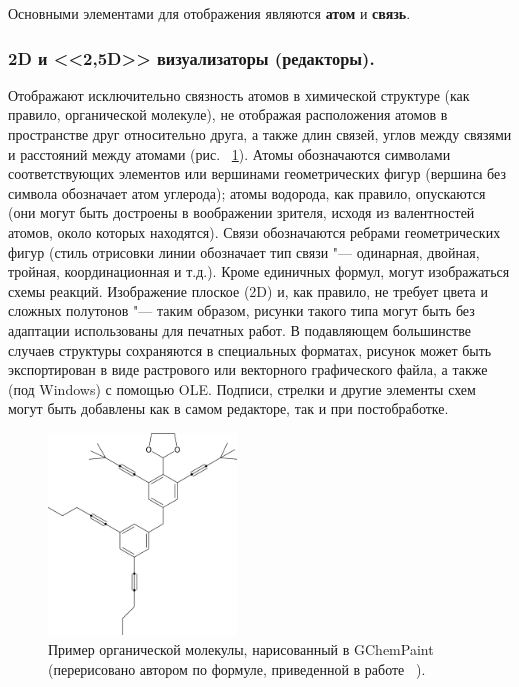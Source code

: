 \documentclass[10pt, a5paper]{article}
\begin{document}
Основными элементами для отображения являются \textbf{атом} и \linebreak\textbf{связь}.

\subsubsection*{2D и <<2,5D>> визуализаторы (редакторы).}

Отображают исключительно связность атомов в \linebreak химической структуре (как правило, органической молекуле), не отображая расположения атомов в пространстве друг относительно друга, а также длин связей, углов между связями и расстояний между атомами (рис. ~\ref{Litvenenka1}). Атомы обозначаются символами соответствующих элементов или вершинами геометрических фигур (вершина без символа обозначает атом углерода); атомы водорода, как правило, опускаются (они могут быть достроены в воображении зрителя, исходя из валентностей атомов, около которых находятся). Связи обозначаются ребрами геометрических фигур (стиль отрисовки линии обозначает тип связи "--- одинарная, двойная, тройная, координационная и т.д.). Кроме единичных формул, могут изображаться схемы реакций. Изображение плоское (2D) и, как правило, не требует цвета и сложных полутонов "--- таким образом, рисунки такого типа могут быть без адаптации использованы для печатных работ. В подавляющем большинстве случаев структуры сохраняются в специальных форматах, рисунок может быть экспортирован в виде растрового или векторного графического файла, а также (под Windows) с помощью OLE. Подписи, стрелки и другие элементы схем могут быть добавлены как в самом редакторе, так и при постобработке.


\begin{figure}[h!]
  \centering
  \includegraphics[width=5cm]{20_2016_Litvenenka1.png}
  \caption{Пример органической молекулы, нарисованный в GChemPaint (перерисовано автором по формуле, приведенной в работе ~\cite{Litvenenka1}).}
  \label{Litvenenka1}
\end{figure}
\end{document}
